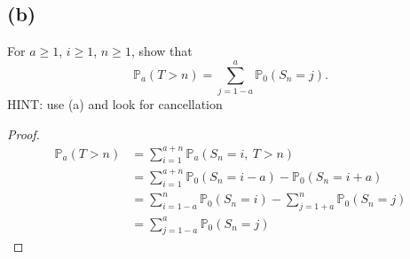\documentclass{article}
\newcommand{\prob}{\mathbb{P}}
\begin{document}
\subsection*{(b)}
For $a\geq1$, $i\geq1$, $n\geq1$, show that
\begin{equation*}
    \mathbb{P}_a(T>n) = \sum_{j=1-a}^a\mathbb{P}_0(S_n=j).
\end{equation*}
HINT: use (a) and look for cancellation
\color{blue}
\begin{proof}
\begin{equation*}
    \begin{split}
        \prob_a(T>n) &= \sum_{i= 1}^{a+n}\prob_a(S_n=i,\ T>n)\\
            &= \sum_{i=1}^{a+n}\prob_0(S_n=i-a) -\prob_0(S_n=i+a)\\
            &= \sum_{i=1-a}^{n}\prob_0(S_n=i)-\sum_{j=1+a}^n\prob_0(S_n=j)\\
            &= \sum_{j=1-a}^a\mathbb{P}_0(S_n=j)
    \end{split}
\end{equation*}
\end{proof}
\color{black}
\end{document}
